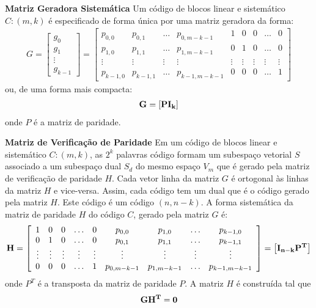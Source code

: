 \begin{definition} {\bf Matriz Geradora Sistemática} \label{matger}   Um código de blocos linear e sistemático $C:(m,k)$ é especificado de forma única por uma matriz geradora da forma:
\begin{align*}
G=\left[\begin{array}{c}
g_0\\
g_1\\
\vdots\\
g_{k-1}
\end{array}\right]=
\left[\begin{array}{ccccccccc}
p_{0,0} & p_{0,1} & \ldots & p_{0,m-k-1} & 1 & 0 & 0 & \ldots & 0 \\
p_{1,0} & p_{1,1} & \ldots & p_{1,m-k-1} & 0 & 1 & 0 & \ldots & 0\\
\vdots & \vdots & \vdots & \vdots & \vdots & \vdots & \vdots & \vdots & \vdots\\
p_{k-1,0} & p_{k-1,1} & \ldots & p_{k-1,m-k-1} & 0 & 0 & 0 & \ldots & 1
\end{array}\right]
\end{align*}
ou, de uma forma mais compacta:
\begin{align*}
{\bf G} = \left[ {\bf P I_k} \right]
\end{align*}
onde {\bf $P$} é a matriz de paridade.
\end{definition}

\begin{definition} {\bf Matriz de Verificação de Paridade} \label{matverpar}   Em um código de blocos linear e sistemático $C:(m,k)$,  as $2^k$ palavras código formam um subespaço vetorial $S$ associado a um subespaço dual $S_d$ do mesmo espaço $V_m$ que é gerado pela matriz de verificação de paridade $H$. Cada vetor linha da matriz $G$ é ortogonal às linhas da matriz $H$ e vice-versa. Assim, cada código tem um dual que é o código gerado pela matriz $H$. Este código é um código $(n, n - k)$. A forma sistemática da matriz de paridade $H$ do código $C$, gerado pela matriz $G$ é:
\begin{align*}
{\bf H} =\left[\begin{array}{ccccccccc}
1 & 0 & 0 & \ldots & 0 & p_{0,0} & p_{1,0} & \ldots & p_{k-1,0}\\
0 & 1 & 0 & \ldots & 0 & p_{0,1} & p_{1,1} & \ldots & p_{k-1,1}\\
\vdots & \vdots & \vdots & \vdots & \vdots & \vdots & \vdots & \vdots & \vdots\\
0 & 0 & 0 & \ldots & 1 & p_{0,m-k-1} & p_{1,m-k-1} & \ldots & p_{k-1,m-k-1}\\
\end{array}\right]=\left[ {\bf I_{n-k}P^T} \right]
\end{align*}
onde {\bf $P^T$} é a transposta da matriz de paridade {\bf $P$}. A matriz {\bf $H$} é construída tal que 
\begin{align*}
{\bf GH^T} = {\bf 0} 
\end{align*}
\end{definition}

